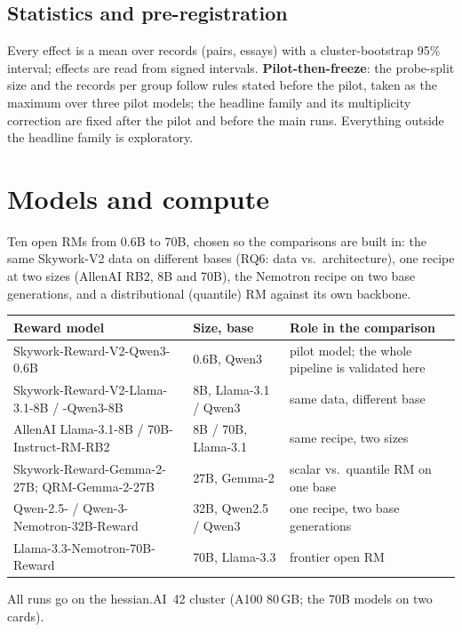 \documentclass[10pt]{article}
\begin{document}
\subsection{Statistics and pre-registration}
Every effect is a mean over records (pairs, essays) with a cluster-bootstrap 95\% interval; effects are read from
signed intervals. \textbf{Pilot-then-freeze}: the probe-split size and the records per group follow rules stated
before the pilot, taken as the maximum over three pilot models; the headline family and its multiplicity correction
are fixed after the pilot and before the main runs. Everything outside the headline family is exploratory.

\section{Models and compute}\label{sec:models}
Ten open RMs from 0.6B to 70B, chosen so the comparisons are built in: the same Skywork-V2 data on different bases
(RQ6: data vs.\ architecture), one recipe at two sizes (AllenAI RB2, 8B and 70B), the Nemotron recipe on two base
generations, and a distributional (quantile) RM against its own backbone.
\begin{center}\small
\begin{tabularx}{\linewidth}{@{}llY@{}}
\toprule
\textbf{Reward model} & \textbf{Size, base} & \textbf{Role in the comparison}\\
\midrule
Skywork-Reward-V2-Qwen3-0.6B & 0.6B, Qwen3 & pilot model; the whole pipeline is validated here\\
Skywork-Reward-V2-Llama-3.1-8B / -Qwen3-8B & 8B, Llama-3.1 / Qwen3 & same data, different base\\
AllenAI Llama-3.1-8B / 70B-Instruct-RM-RB2 & 8B / 70B, Llama-3.1 & same recipe, two sizes\\
Skywork-Reward-Gemma-2-27B; QRM-Gemma-2-27B & 27B, Gemma-2 & scalar vs.\ quantile RM on one base\\
Qwen-2.5- / Qwen-3-Nemotron-32B-Reward & 32B, Qwen2.5 / Qwen3 & one recipe, two base generations\\
Llama-3.3-Nemotron-70B-Reward & 70B, Llama-3.3 & frontier open RM\\
\bottomrule
\end{tabularx}
\end{center}
All runs go on the hessian.AI~42 cluster (A100 80\,GB; the 70B models on two cards).
\end{document}
